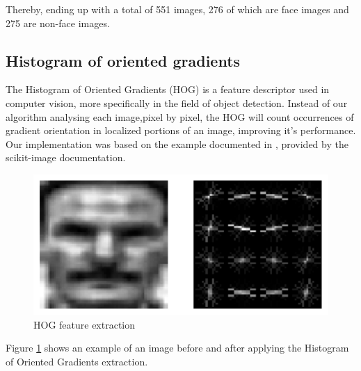 Thereby, ending up with a total of 551 images, 276  of  which  are  face images and 275 are non-face images.

\subsection{Histogram of oriented gradients}
The Histogram of Oriented Gradients (HOG) is a feature descriptor used in computer vision, more specifically in the field of object detection. Instead of our algorithm analysing each image,pixel by pixel, the HOG will count occurrences of gradient orientation in localized portions of an image, improving it's performance. 
Our implementation was based on the example documented in \cite{scikit-hog}, provided by the scikit-image documentation.

\begin{figure}[htbp]
\centerline{\includegraphics[scale=0.35]{images/hog_image.png}}
\caption{HOG feature extraction}
\label{fig:hog}
\end{figure}

Figure \ref{fig:hog} shows an example of an image before and after applying the Histogram of Oriented Gradients extraction.